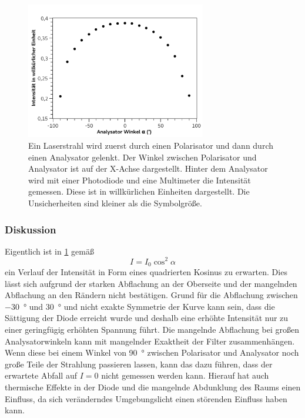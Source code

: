 \documentclass[
	a4paper,
	12pt,
	pagesize,
	ngerman
]{scrartcl}
\begin{document}
	\begin{figure}[H] %
		\includegraphics[width=0.7\textwidth]{fig_Malus1}
		\centering
		\caption{Ein Laserstrahl wird zuerst durch einen Polarisator und dann durch einen Analysator gelenkt. 
		Der Winkel zwischen Polarisator und Analysator ist auf der X-Achse dargestellt. 
		Hinter dem Analysator wird mit einer Photodiode und eine Multimeter die Intensität gemessen. 
		Diese ist in willkürlichen Einheiten dargestellt. 
		Die Unsicherheiten sind kleiner als die Symbolgröße.} 
		\label{fig_Malus1}
		\centering
	\end{figure}

	\subsubsection{Diskussion}
	
	Eigentlich ist in \cref{fig_Malus1} gemäß
	\begin{equation}
		I = I_0 \cos^2 \alpha
		\label{eq_malus}
	\end{equation}
	ein Verlauf der Intensität in Form eines quadrierten Kosinus zu erwarten.
	Dies lässt sich aufgrund der starken Abflachung an der Oberseite und der mangelnden Abflachung an den Rändern nicht bestätigen.
	Grund für die Abflachung zwischen \SI{-30}{\degree} und \SI{30}{\degree} und nicht exakte Symmetrie der Kurve kann sein, dass die Sättigung der Diode erreicht wurde und deshalb eine erhöhte Intensität nur zu einer geringfügig erhöhten Spannung führt.
	Die mangelnde Abflachung bei großen Analysatorwinkeln kann mit mangelnder Exaktheit der Filter zusammenhängen.
	Wenn diese bei einem Winkel von \SI{90}{\degree} zwischen Polarisator und Analysator noch große Teile der Strahlung passieren lassen, kann das dazu führen, dass der erwartete Abfall auf $I = 0$ nicht gemessen werden kann.
	Hierauf hat auch thermische Effekte in der Diode und die mangelnde Abdunklung des Raums einen Einfluss, da sich veränderndes Umgebungslicht einen störenden Einfluss haben kann. %
	
\end{document}
